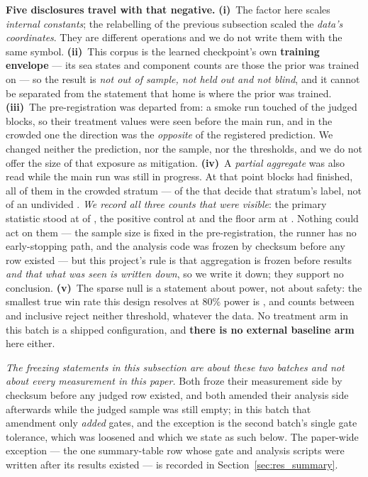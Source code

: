 \documentclass[review]{elsarticle}
\begin{document}
\textbf{Five disclosures travel with that negative.} \textbf{(i)}~The factor here
scales \emph{internal constants}; the relabelling of the previous subsection scaled
the \emph{data's coordinates}. They are different operations and we do not write them
with the same symbol. \textbf{(ii)}~This corpus is the learned checkpoint's own
\textbf{training envelope} --- its sea states and component counts are those the
prior was trained on --- so the result is \emph{not out of sample, not held out and
not blind}, and it cannot be separated from the statement that home is where the
prior was trained. \textbf{(iii)}~The pre-registration was departed from: a smoke run
touched \TFifteenSmokeExposed{} of the \TFifteenCorpusN{} judged blocks, so their
treatment values were seen before the main run, and in the crowded one the direction
was the \emph{opposite} of the registered prediction. We changed neither the
prediction, nor the sample, nor the thresholds, and we do not offer the size of that
exposure as mitigation. \textbf{(iv)}~A \emph{partial aggregate} was also read
while the main run was still in progress. At that point \TFifteenPeekAt{} blocks had
finished, all of them in the crowded stratum --- \TFifteenPeekAt{} of the
\TFifteenN{} that decide that stratum's label, not \TFifteenPeekAt{} of an undivided
\TFifteenCorpusN{}. \emph{We record all three counts that were visible}: the primary
statistic stood at \TFifteenPeekWin{} of \TFifteenPeekAt{}, the positive control at
\TFifteenPeekCtrl{} and the floor arm at \TFifteenPeekFloor{}. Nothing could act on
them --- the sample size is fixed in the pre-registration, the runner has no
early-stopping path, and the analysis code was frozen by checksum before any row
existed --- but this project's rule is that aggregation is frozen before results
\emph{and that what was seen is written down}, so we write it down; they support no
conclusion.
\textbf{(v)}~The sparse null is a statement about power, not about safety: the
smallest true win rate this design resolves at $80\%$ power is \TFifteenMDE{},
and counts between
\TFifteenUnrejLo{} and \TFifteenUnrejHi{} inclusive reject neither threshold, whatever
the data. No treatment arm in this batch is a shipped
configuration, and \textbf{there is no external baseline arm} here either.

\emph{The freezing statements in this subsection are about these two batches and not
about every measurement in this paper.} Both froze their measurement side by checksum
before any judged row existed, and both amended their analysis side afterwards while
the judged sample was still empty; in this batch that amendment only \emph{added}
gates, and the exception is the second batch's single gate tolerance, which was
loosened and which we state as such below. The paper-wide exception --- the one
summary-table row whose gate and analysis scripts were written after its results
existed --- is recorded in Section~\ref{sec:res_summary}.
\end{document}
